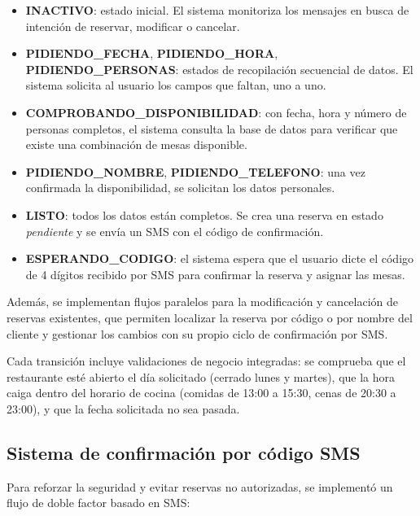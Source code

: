 \begin{itemize}
    \item \textbf{INACTIVO}: estado inicial. El sistema monitoriza los mensajes en busca de intención de reservar, modificar o cancelar.
    \item \textbf{PIDIENDO\_FECHA}, \textbf{PIDIENDO\_HORA}, \textbf{PIDIENDO\_PERSONAS}: estados de recopilación secuencial de datos. El sistema solicita al usuario los campos que faltan, uno a uno.
    \item \textbf{COMPROBANDO\_DISPONIBILIDAD}: con fecha, hora y número de personas completos, el sistema consulta la base de datos para verificar que existe una combinación de mesas disponible.
    \item \textbf{PIDIENDO\_NOMBRE}, \textbf{PIDIENDO\_TELEFONO}: una vez confirmada la disponibilidad, se solicitan los datos personales.
    \item \textbf{LISTO}: todos los datos están completos. Se crea una reserva en estado \textit{pendiente} y se envía un SMS con el código de confirmación.
    \item \textbf{ESPERANDO\_CODIGO}: el sistema espera que el usuario dicte el código de 4 dígitos recibido por SMS para confirmar la reserva y asignar las mesas.
\end{itemize}

Además, se implementan flujos paralelos para la modificación y cancelación de reservas existentes, que permiten localizar la reserva por código o por nombre del cliente y gestionar los cambios con su propio ciclo de confirmación por SMS.


Cada transición incluye validaciones de negocio integradas: se comprueba que el restaurante esté abierto el día solicitado (cerrado lunes y martes), que la hora caiga dentro del horario de cocina (comidas de 13:00 a 15:30, cenas de 20:30 a 23:00), y que la fecha solicitada no sea pasada.

\subsection{Sistema de confirmación por código SMS}
\label{subsec:confirmacion_sms_impl}

Para reforzar la seguridad y evitar reservas no autorizadas, se implementó un flujo de doble factor basado en SMS:


